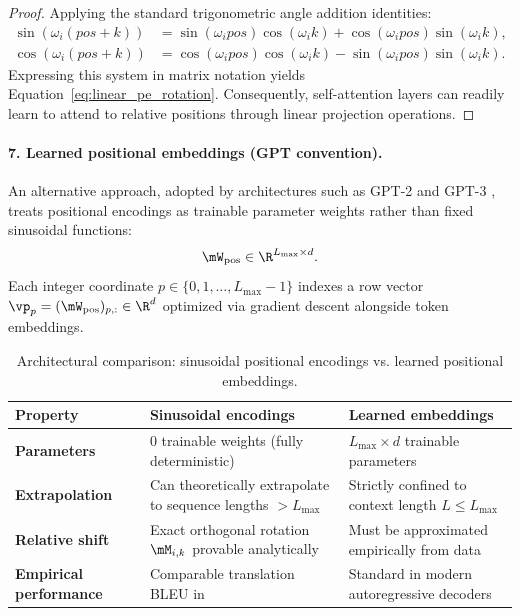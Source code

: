 \documentclass[../../main.tex]{subfiles}
\begin{document}
\begin{enumerate}
\begin{proof}
    Applying the standard trigonometric angle addition identities:
    \begin{align}
    \sin(\omega_i(pos + k)) &= \sin(\omega_i pos)\cos(\omega_i k) + \cos(\omega_i pos)\sin(\omega_i k), \\
    \cos(\omega_i(pos + k)) &= \cos(\omega_i pos)\cos(\omega_i k) - \sin(\omega_i pos)\sin(\omega_i k).
    \end{align}
    Expressing this system in matrix notation yields Equation~\eqref{eq:linear_pe_rotation}. Consequently, self-attention layers can readily learn to attend to relative positions through linear projection operations.
    \end{proof}
\end{enumerate}

\paragraph{7. Learned positional embeddings (GPT convention).}
An alternative approach, adopted by architectures such as GPT-2 and GPT-3 \cite{radford2019, brown2020}, treats positional encodings as trainable parameter weights rather than fixed sinusoidal functions:
\begin{equation}
\label{eq:pos_embedding_layer}
\mW_{\text{pos}} \in \R^{L_{\max} \times d}.
\end{equation}
Each integer coordinate $p \in \{0, 1, \dots, L_{\max}-1\}$ indexes a row vector $\vp_p = (\mW_{\text{pos}})_{p, :} \in \R^d$ optimized via gradient descent alongside token embeddings.

\begin{table}[htbp]
\centering
\small
\caption{Architectural comparison: sinusoidal positional encodings vs. learned positional embeddings.}
\label{tab:pe_comparison}
\begin{tabularx}{\textwidth}{lXX}
\toprule
\textbf{Property} & \textbf{Sinusoidal encodings \cite{vaswani2017}} & \textbf{Learned embeddings \cite{radford2019}} \\
\midrule
\textbf{Parameters} & $0$ trainable weights (fully deterministic) & $L_{\max} \times d$ trainable parameters \\
\textbf{Extrapolation} & Can theoretically extrapolate to sequence lengths $> L_{\max}$ & Strictly confined to context length $L \le L_{\max}$ \\
\textbf{Relative shift} & Exact orthogonal rotation $\mM_{i, k}$ provable analytically & Must be approximated empirically from data \\
\textbf{Empirical performance} & Comparable translation BLEU in \cite{vaswani2017} & Standard in modern autoregressive decoders \\
\bottomrule
\end{tabularx}
\end{table}
\end{document}
